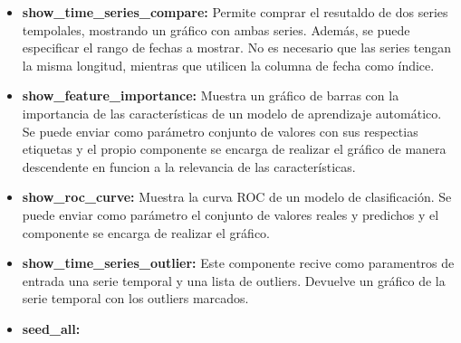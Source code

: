 
\begin{itemize}
    \item \textbf{show\_time\_series\_compare:} Permite comprar el resutaldo de dos series tempolales,
    mostrando un gráfico con ambas series. Además, se puede especificar el rango de fechas a mostrar.
    No es necesario que las series tengan la misma longitud, mientras que utilicen la columna de fecha
    como índice.
    \item \textbf{show\_feature\_importance:} Muestra un gráfico de barras con la importancia de las
    características de un modelo de aprendizaje automático. Se puede enviar como parámetro conjunto 
    de valores con sus respectias etiquetas y el propio componente se encarga de realizar el gráfico
    de manera descendente en funcion a la relevancia de las características.
    \item \textbf{show\_roc\_curve:} Muestra la curva ROC de un modelo de clasificación. Se puede
    enviar como parámetro el conjunto de valores reales y predichos y el componente se encarga de
    realizar el gráfico.
    \item \textbf{show\_time\_series\_outlier:} Este componente recive como paramentros de entrada
    una serie temporal y una lista de outliers. Devuelve un gráfico de la serie temporal con los
    outliers marcados. 
\end{itemize}

\begin{itemize}
    \item \textbf{seed\_all:}
\end{itemize}    
